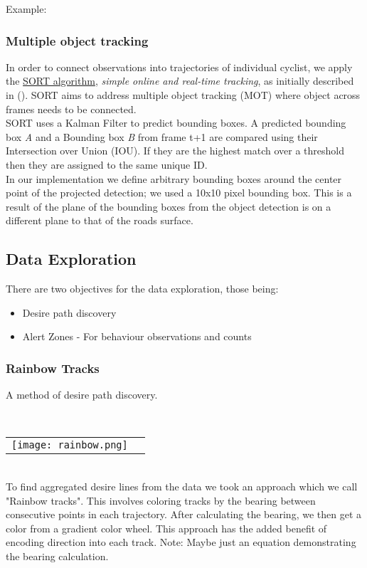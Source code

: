 Example:

\subsubsection{Multiple object tracking}

In order to connect observations into trajectories of individual cyclist, we apply 
the \href{https://github.com/abewley/sort}{SORT algorithm}, \textit{simple online and real-time tracking}, as initially described in (\cite{Bewley2016_sort}). 
SORT aims to address multiple object tracking (MOT) where object across frames needs to be connected. 
\ \\ 
SORT uses a Kalman Filter to predict bounding boxes. A predicted bounding box \textit{A} and a Bounding box \textit{B} from 
frame t+1 are compared using their Intersection over Union (IOU). If they are the highest match over a threshold then
they are assigned to the same unique ID.
\ \\
In our implementation we define arbitrary bounding boxes around the center point of the projected detection; 
we used a 10x10 pixel bounding box. This is a result of the plane of the bounding boxes from the object detection is on
a different plane to that of the roads surface.

\subsection{Data Exploration}
There are two objectives for the data exploration, those being:
\begin{itemize}
	\item Desire path discovery
	\item Alert Zones - For behaviour observations and counts
\end{itemize}

\subsubsection{Rainbow Tracks}

A method of desire path discovery.

\ \\ 
\noindent
\begin{tabular}{@{}cc}
\texttt{[image: rainbow.png]} 
\end{tabular}
\label{Rainbow}
\ \\

To find aggregated desire lines from the data we took an approach which we call "Rainbow tracks". This involves coloring tracks by the bearing between consecutive points in each trajectory. After calculating the bearing, we then get a color from a gradient color wheel. This approach has the added benefit of encoding direction into 
each track.
Note: Maybe just an equation demonstrating the bearing calculation.
\ \\ 

